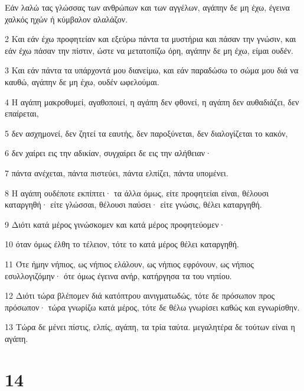 \par Εάν λαλώ τας γλώσσας των ανθρώπων και των αγγέλων, αγάπην δε μη έχω, έγεινα χαλκός ηχών ή κύμβαλον αλαλάζον.
\par 2 Και εάν έχω προφητείαν και εξεύρω πάντα τα μυστήρια και πάσαν την γνώσιν, και εάν έχω πάσαν την πίστιν, ώστε να μετατοπίζω όρη, αγάπην δε μη έχω, είμαι ουδέν.
\par 3 Και εάν πάντα τα υπάρχοντά μου διανείμω, και εάν παραδώσω το σώμα μου διά να καυθώ, αγάπην δε μη έχω, ουδέν ωφελούμαι.
\par 4 Η αγάπη μακροθυμεί, αγαθοποιεί, η αγάπη δεν φθονεί, η αγάπη δεν αυθαδιάζει, δεν επαίρεται,
\par 5 δεν ασχημονεί, δεν ζητεί τα εαυτής, δεν παροξύνεται, δεν διαλογίζεται το κακόν,
\par 6 δεν χαίρει εις την αδικίαν, συγχαίρει δε εις την αλήθειαν·
\par 7 πάντα ανέχεται, πάντα πιστεύει, πάντα ελπίζει, πάντα υπομένει.
\par 8 Η αγάπη ουδέποτε εκπίπτει· τα άλλα όμως, είτε προφητείαι είναι, θέλουσι καταργηθή· είτε γλώσσαι, θέλουσι παύσει· είτε γνώσις, θέλει καταργηθή.
\par 9 Διότι κατά μέρος γινώσκομεν και κατά μέρος προφητεύομεν·
\par 10 όταν όμως έλθη το τέλειον, τότε το κατά μέρος θέλει καταργηθή.
\par 11 Ότε ήμην νήπιος, ως νήπιος ελάλουν, ως νήπιος εφρόνουν, ως νήπιος εσυλλογιζόμην· ότε όμως έγεινα ανήρ, κατήργησα τα του νηπίου.
\par 12 Διότι τώρα βλέπομεν διά κατόπτρου αινιγματωδώς, τότε δε πρόσωπον προς πρόσωπον· τώρα γνωρίζω κατά μέρος, τότε δε θέλω γνωρίσει καθώς και εγνωρίσθην.
\par 13 Τώρα δε μένει πίστις, ελπίς, αγάπη, τα τρία ταύτα. μεγαλητέρα δε τούτων είναι η αγάπη.

\chapter{14}

